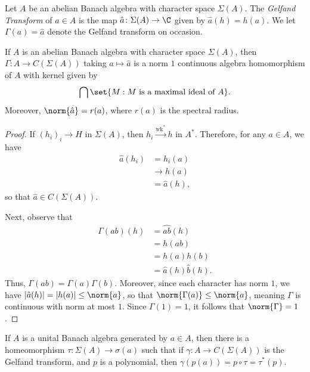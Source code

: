 \documentclass[10pt]{mypackage}
\begin{document}
\begin{definition}
  Let $A$ be an abelian Banach algebra with character space $\Sigma(A)$. The \textit{Gelfand Transform} of $a\in A$ is the map $\hat{a}\colon \Sigma(A)\rightarrow \C$ given by $\hat{a}(h) = h(a)$. We let $\Gamma(a) = \hat{a}$ denote the Gelfand transform on occasion.
\end{definition}
\begin{theorem}
  If $A$ is an abelian Banach algebra with character space $\Sigma(A)$, then $\Gamma\colon A\rightarrow C\left( \Sigma(A) \right)$ taking $a\mapsto \hat{a}$ is a norm $1$ continuous algebra homomorphism of $A$ with kernel given by
  \begin{align*}
    \bigcap \set{M : M\text{ is a maximal ideal of }A}.
  \end{align*}
  Moreover, $\norm{\hat{a}} = r(a)$, where $r(a)$ is the spectral radius.
\end{theorem}
\begin{proof}
  If $\left( h_i \right)_i\rightarrow H$ in $\Sigma(A)$, then $h_i\xrightarrow{\operatorname{wk}^{\ast}} h$ in $A^{\ast}$. Therefore, for any $a\in A$, we have
  \begin{align*}
    \hat{a}\left( h_i \right) &= h_i(a)\\
                              &\rightarrow h(a)\\
                              &= \hat{a}(h),
  \end{align*}
  so that $\hat{a}\in C\left( \Sigma\left( A \right) \right)$.

  Next, observe that
  \begin{align*}
    \Gamma\left( ab \right)\left( h \right) &= \widehat{ab}\left( h \right)\\
                                            &= h\left( ab \right)\\
                                            &= h(a)h(b)\\
                                            &= \hat{a}(h)\hat{b}(h).
  \end{align*}
  Thus, $\Gamma\left( ab \right) = \Gamma\left( a \right)\Gamma\left( b \right)$. Moreover, since each character has norm $1$, we have $\left\vert \hat{a}(h) \right\vert = \left\vert h(a) \right\vert\leq \norm{a}$, so that $\norm{\Gamma(a)} \leq \norm{a}$, meaning $\Gamma$ is continuous with norm at most $1$. Since $\Gamma(1) = 1$, it follows that $\norm{\Gamma} = 1$.
\end{proof}
\begin{proposition}
  If $A$ is a unital Banach algebra generated by $a\in A$, then there is a homeomorphism $\tau\colon \Sigma\left( A \right)\to \sigma\left( a \right)$ such that if $\gamma\colon A\to C\left( \Sigma\left( A \right) \right)$ is the Gelfand transform, and $p$ is a polynomial, then $\gamma\left( p(a) \right) = p\circ \tau = \tau^{\ast}\left( p \right)$. 
\end{proposition}
\end{document}
